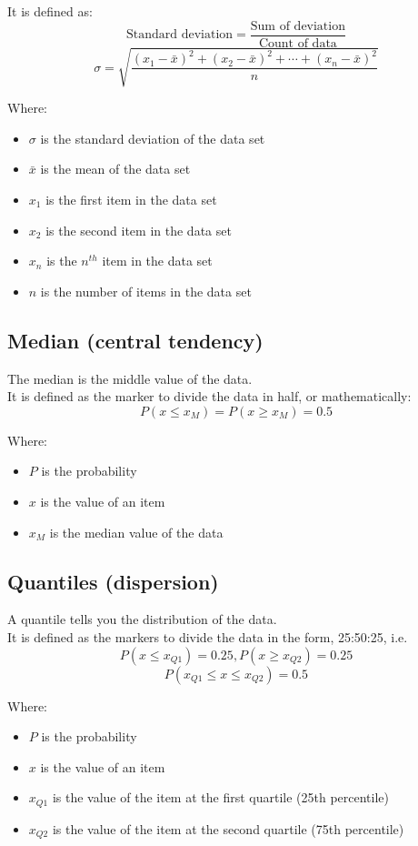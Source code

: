 \documentclass[11pt]{article}
\begin{document}
It is defined as:
\[\text{Standard deviation} = \frac{\text{Sum of deviation}}{\text{Count of data}}\]
\[\sigma = \sqrt{\frac{(x_1 - \bar{x})^2 + (x_2 - \bar{x})^2 + \cdots + (x_n - \bar{x})^2}{n}}\]

Where:
\begin{itemize}
\item \(\sigma\) is the standard deviation of the data set
\item \(\bar{x}\) is the mean of the data set
\item \(x_1\) is the first item in the data set
\item \(x_2\) is the second item in the data set
\item \(x_n\) is the \(n^{th}\) item in the data set
\item \(n\) is the number of items in the data set
\end{itemize}
\subsection{Median (central tendency)}
\label{sec:org173912a}
The median is the middle value of the data.  \\

It is defined as the marker to divide the data in half, or mathematically:
\[P \left(x \le x_M \right) = P \left( x \ge x_M \right) = 0.5\]

Where:
\begin{itemize}
\item \(P\) is the probability
\item \(x\) is the value of an item
\item \(x_M\) is the median value of the data
\end{itemize}
\subsection{Quantiles (dispersion)}
\label{sec:org2cc35a1}
A quantile tells you the distribution of the data.  \\

It is defined as the markers to divide the data in the form, 25:50:25, i.e.
\[P \left(x \le x_{Q1}\right) = 0.25, P \left(x \ge x_{Q2} \right) = 0.25\]
\[P(x_{Q1} \le x \le x_{Q2}) = 0.5\]

Where:
\begin{itemize}
\item \(P\) is the probability
\item \(x\) is the value of an item
\item \(x_{Q1}\) is the value of the item at the first quartile (25th percentile)
\item \(x_{Q2}\) is the value of the item at the second quartile (75th percentile)
\end{itemize}
\end{document}
